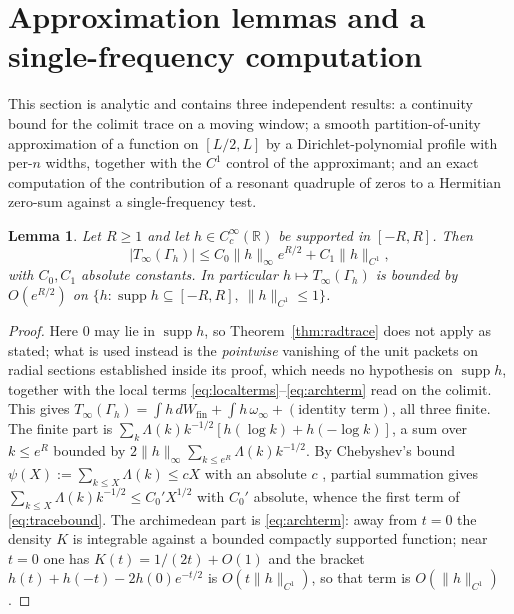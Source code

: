\documentclass[11pt]{amsart}
\newtheorem{lemma}[theorem]{Lemma}
\theoremstyle{definition}
\theoremstyle{remark}
\newcommand{\R}{\mathbb R}
\newcommand{\supp}{\operatorname{supp}}
\newcommand{\Wfin}{W_{\mathrm{fin}}}
\begin{document}
\section{Approximation lemmas and a single-frequency computation}
\label{sec:approx}

This section is analytic and contains three independent results: a continuity bound for the
colimit trace on a moving window; a smooth partition-of-unity approximation of
a function on $[L/2,L]$ by a Dirichlet-polynomial profile with per-$n$ widths,
together with the $C^1$ control of the approximant; and an exact computation of
the contribution of a resonant quadruple of zeros to a Hermitian zero-sum
against a single-frequency test.

\begin{lemma}\label{lem:traceontinuity}
Let $R\ge1$ and let $h\in C_c^\infty(\R)$ be supported in $[-R,R]$. Then
\begin{equation}\label{eq:tracebound}
  |T_\infty(\Gamma_h)|\le C_0\|h\|_\infty e^{R/2}+C_1\|h\|_{C^1},
\end{equation}
with $C_0,C_1$ absolute constants. In particular
$h\mapsto T_\infty(\Gamma_h)$ is bounded by $O(e^{R/2})$ on
$\{h:\supp h\subseteq[-R,R],\ \|h\|_{C^1}\le1\}$.
\end{lemma}

\begin{proof}
Here $0$ may lie in $\supp h$, so Theorem~\ref{thm:radtrace} does not apply as
stated; what is used instead is the \emph{pointwise} vanishing of the unit
packets on radial sections established inside its proof, which needs no
hypothesis on $\supp h$, together with the local terms
\eqref{eq:localterms}--\eqref{eq:archterm} read on the colimit. This gives
$T_\infty(\Gamma_h)=\int h\,d\Wfin+\int h\,\omega_\infty+(\text{identity
term})$, all three finite. The finite part is
$\sum_k\Lambda(k)k^{-1/2}[h(\log k)+h(-\log k)]$, a sum over $k\le e^R$ bounded
by $2\|h\|_\infty\sum_{k\le e^R}\Lambda(k)k^{-1/2}$. By Chebyshev's bound
$\psi(X):=\sum_{k\le X}\Lambda(k)\le cX$ with an absolute $c$
\cite[Ch.~2]{IK}, partial summation gives
$\sum_{k\le X}\Lambda(k)k^{-1/2}\le C_0'X^{1/2}$ with $C_0'$ absolute, whence
the first term of \eqref{eq:tracebound}.  The archimedean part is
\eqref{eq:archterm}: away from $t=0$ the density $K$ is integrable against a
bounded compactly supported function; near $t=0$ one has $K(t)=1/(2t)+O(1)$ and
the bracket $h(t)+h(-t)-2h(0)e^{-t/2}$ is $O(t\|h\|_{C^1})$, so that term is
$O(\|h\|_{C^1})$.
\end{proof}
\end{document}
